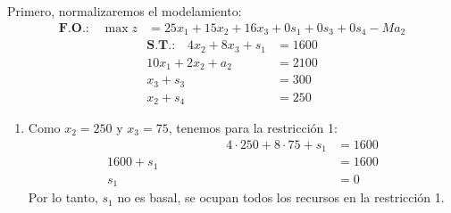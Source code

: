 Primero, normalizaremos el modelamiento:
\begin{align*}
\textbf{F.O.:} \quad \max z &= 25{x_1} + 15{x_2} + 16{x_3} + 0{s_1} + 0{s_3} + 0{s_4} - M{a_2}
\end{align*}
\vspace{-1cm}
\begin{align*}
	\textbf{S.T.:} \quad
		4{x_2} + 8{x_3} + s_1 &= 1600\\
		10{x_1} + 2{x_2} + a_2 &= 2100\\ 
		x_3 + s_3 &= 300\\ 
		x_2 + s_4 &= 250
\end{align*}

\begin{enumerate}
	\item
		Como $x_2 = 250$ y $x_3 = 75$, tenemos para la restricción 1:
		\begin{align*}
			\hspace{4cm}
				4\cdot250 + 8\cdot75 + s_1 &= 1600 \\ 
				1600 + s_1 &= 1600 \\
				s_1 &= 0
		\end{align*}
		Por lo tanto, $s_1$ no es basal, se ocupan todos los 
		recursos en la restricción 1.


\end{enumerate}
